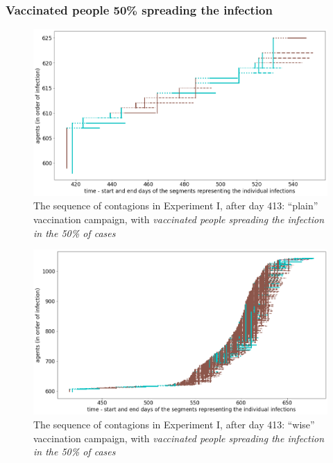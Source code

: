 \documentclass[graybox]{svmult}
\begin{document}
\subsubsection{Vaccinated people 50\% spreading the infection}

\begin{figure}[t]
\center
\includegraphics[scale=0.3]{ExperimentForGA_I_05>413.png}

\caption{The sequence of contagions in Experiment I, after day 413: ``plain'' vaccination campaign, with \emph{vaccinated people spreading the infection in the 50\% of cases}} 
\label{ExperimentForGA_I_05>413}
\end{figure}

\begin{figure}[t]
\center
\includegraphics[scale=0.3]{ExperimentForGA_I_2_05>413.png}

\caption{The sequence of contagions in Experiment I, after day 413: ``wise'' vaccination campaign, with \emph{vaccinated people spreading the infection in the 50\% of cases}} 
\label{ExperimentForGA_I_2_05>413}
\end{figure}
\end{document}
